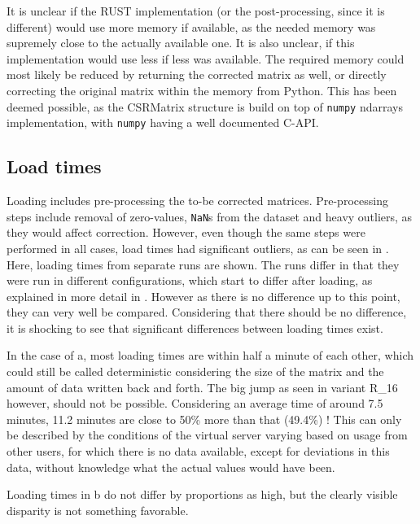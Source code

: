 It is unclear if the RUST implementation (or the post-processing, since it is
different) would use more memory if available, as the needed memory was
supremely close to the actually available one. It is also unclear, if this
implementation would use less if less was available. The required memory could
most likely be reduced by returning the corrected matrix as well, or directly
correcting the original matrix within the memory from Python. This has been
deemed possible, as the CSRMatrix structure is build on top of \verb|numpy|
ndarrays implementation, with \verb|numpy| having a well documented C-API.





\subsection{Load times}\label{sec:loadtime}



Loading includes pre-processing the to-be corrected matrices. Pre-processing
steps include removal of zero-values, \verb|NaN|s from the dataset and
heavy outliers, as they would affect correction. However, even though the same
steps were performed in all cases, load times had significant outliers, as can
be seen in . Here, loading times from separate runs are
shown. The runs differ in that they were run in different configurations, which
start to differ after loading, as explained in more detail in
. However as there is no difference up to this point,
they can very well be compared. Considering that there should be no difference,
it is shocking to see that significant differences between loading times exist.

In the case of a, most loading times are within half a
minute of each other, which could still be called deterministic considering the
size of the matrix and the amount of data written back and forth. The big jump
as seen in variant R\_16 however, should not be possible. Considering an
average time of around 7.5 minutes, 11.2 minutes are close to 50\% more than
that (49.4\%) ! This can only be described by the conditions of the virtual
server varying based on usage from other users, for which there is no data
available, except for deviations in this data, without knowledge what the
actual values would have been.

Loading times in b do not differ by proportions as high,
but the clearly visible disparity is not something favorable.



